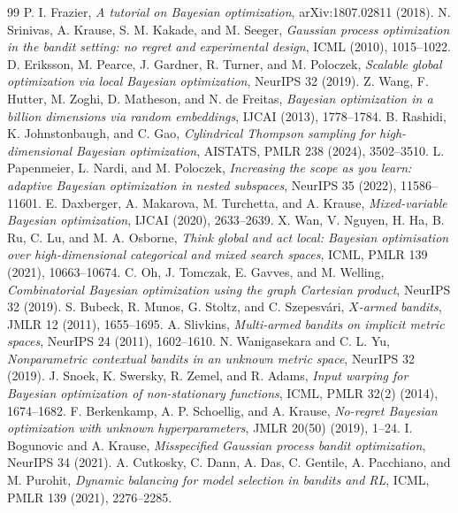 \documentclass[11pt]{article}
\theoremstyle{definition}
\theoremstyle{remark}
\newcommand{\1}{\mathbf 1}
\begin{document}
\begin{thebibliography}{99}\small
{} P. I. Frazier, \emph{A tutorial on Bayesian optimization}, arXiv:1807.02811
(2018).
 N. Srinivas, A. Krause, S. M. Kakade, and M. Seeger, \emph{Gaussian process
optimization in the bandit setting: no regret and experimental design}, ICML (2010), 1015--1022.
 D. Eriksson, M. Pearce, J. Gardner, R. Turner, and M. Poloczek,
\emph{Scalable global optimization via local Bayesian optimization}, NeurIPS 32 (2019).
 Z. Wang, F. Hutter, M. Zoghi, D. Matheson, and N. de Freitas,
\emph{Bayesian optimization in a billion dimensions via random embeddings}, IJCAI (2013),
1778--1784.
 B. Rashidi, K. Johnstonbaugh, and C. Gao, \emph{Cylindrical Thompson sampling for
high-dimensional Bayesian optimization}, AISTATS, PMLR 238 (2024), 3502--3510.
 L. Papenmeier, L. Nardi, and M. Poloczek, \emph{Increasing the scope as you learn:
adaptive Bayesian optimization in nested subspaces}, NeurIPS 35 (2022), 11586--11601.
 E. Daxberger, A. Makarova, M. Turchetta, and A. Krause,
\emph{Mixed-variable Bayesian optimization}, IJCAI (2020), 2633--2639.
 X. Wan, V. Nguyen, H. Ha, B. Ru, C. Lu, and M. A. Osborne,
\emph{Think global and act local: Bayesian optimisation over high-dimensional categorical and mixed
search spaces}, ICML, PMLR 139 (2021), 10663--10674.
 C. Oh, J. Tomczak, E. Gavves, and M. Welling,
\emph{Combinatorial Bayesian optimization using the graph Cartesian product}, NeurIPS 32 (2019).
 S. Bubeck, R. Munos, G. Stoltz, and C. Szepesv\'ari, \emph{$X$-armed bandits},
JMLR 12 (2011), 1655--1695.
 A. Slivkins, \emph{Multi-armed bandits on implicit metric spaces},
NeurIPS 24 (2011), 1602--1610.
 N. Wanigasekara and C. L. Yu, \emph{Nonparametric contextual bandits in an
unknown metric space}, NeurIPS 32 (2019).
 J. Snoek, K. Swersky, R. Zemel, and R. Adams, \emph{Input warping for
Bayesian optimization of non-stationary functions}, ICML, PMLR 32(2) (2014), 1674--1682.
 F. Berkenkamp, A. P. Schoellig, and A. Krause, \emph{No-regret Bayesian
optimization with unknown hyperparameters}, JMLR 20(50) (2019), 1--24.
 I. Bogunovic and A. Krause, \emph{Misspecified Gaussian process bandit
optimization}, NeurIPS 34 (2021).
 A. Cutkosky, C. Dann, A. Das, C. Gentile, A. Pacchiano, and M. Purohit,
\emph{Dynamic balancing for model selection in bandits and RL}, ICML, PMLR 139 (2021), 2276--2285.

\end{thebibliography}
\end{document}
